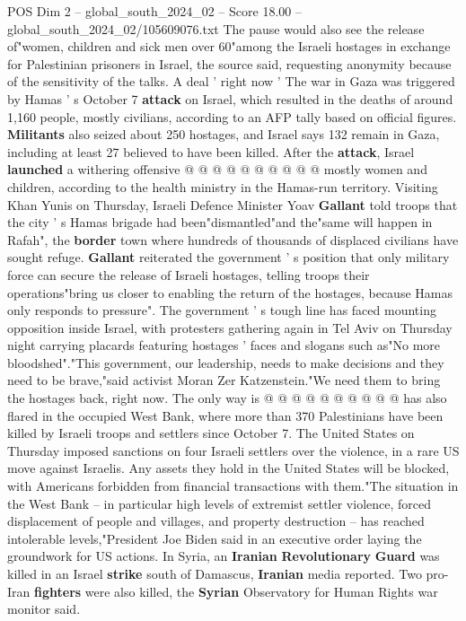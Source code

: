 \begin{textsample}{POS Dim 2 – global\_south\_2024\_02 – Score 18.00 – global\_south\_2024\_02/105609076.txt}
The pause would also see the release of"women, children and sick men over 60"among the Israeli hostages in exchange for Palestinian prisoners in Israel, the source said, requesting anonymity because of the sensitivity of the talks.
A deal ' right now ' The war in Gaza was triggered by Hamas ' s October 7 \textbf{attack} on Israel, which resulted in the deaths of around 1,160 people, mostly civilians, according to an AFP tally based on official figures. \textbf{Militants} also seized about 250 hostages, and Israel says 132 remain in Gaza, including at least 27 believed to have been killed.
After the \textbf{attack}, Israel \textbf{launched} a withering offensive @ @ @ @ @ @ @ @ @ @ mostly women and children, according to the health ministry in the Hamas-run territory.
Visiting Khan Yunis on Thursday, Israeli Defence Minister Yoav \textbf{Gallant} told troops that the city ' s Hamas brigade had been"dismantled"and the"same will happen in Rafah", the \textbf{border} town where hundreds of thousands of displaced civilians have sought refuge. \textbf{Gallant} reiterated the government ' s position that only military force can secure the release of Israeli hostages, telling troops their operations"bring us closer to enabling the return of the hostages, because Hamas only responds to pressure".
The government ' s tough line has faced mounting opposition inside Israel, with protesters gathering again in Tel Aviv on Thursday night carrying placards featuring hostages ' faces and slogans such as"No more bloodshed"."This government, our leadership, needs to make decisions and they need to be brave,"said activist Moran Zer Katzenstein."We need them to bring the hostages back, right now.
The only way is @ @ @ @ @ @ @ @ @ @ has also flared in the occupied West Bank, where more than 370 Palestinians have been killed by Israeli troops and settlers since October 7.
The United States on Thursday imposed sanctions on four Israeli settlers over the violence, in a rare US move against Israelis.
Any assets they hold in the United States will be blocked, with Americans forbidden from financial transactions with them."The situation in the West Bank -- in particular high levels of extremist settler violence, forced displacement of people and villages, and property destruction -- has reached intolerable levels,"President Joe Biden said in an executive order laying the groundwork for US actions.
In Syria, an \textbf{Iranian} \textbf{Revolutionary} \textbf{Guard} was killed in an Israel \textbf{strike} south of Damascus, \textbf{Iranian} media reported.
Two pro-Iran \textbf{fighters} were also killed, the \textbf{Syrian} Observatory for Human Rights war monitor said.

\end{textsample}

